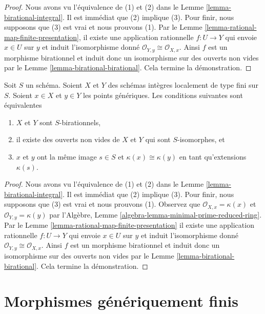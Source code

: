 \begin{proof}
Nous avons vu l'équivalence de (1) et (2) dans
le Lemme \ref{lemma-birational-integral}. Il est immédiat
que (2) implique (3). Pour finir,
nous supposons que (3) est vrai et nous
prouvons (1). Par le Lemme \ref{lemma-rational-map-finite-presentation}, il existe une
application rationnelle $f : U \to Y$
qui envoie $x \in U$ sur $y$
et induit l'isomorphisme donné $\mathcal{O}_{Y, y} \cong \mathcal{O}_{X, x}$. Ainsi $f$ est
un morphisme birationnel et induit donc un isomorphisme
sur des ouverts non
vides par le Lemme \ref{lemma-birational-birational}. Cela termine
la démonstration.
\end{proof}

\begin{lemma}
\label{lemma-common-open}
Soit $S$ un schéma. Soient $X$ et $Y$ des schémas intègres localement
de type fini sur $S$. Soient $x \in X$ et $y \in Y$ les points génériques. Les conditions
suivantes sont équivalentes
\begin{enumerate}
\item $X$ et $Y$ sont $S$-birationnels,
\item il existe des ouverts non vides de $X$ et $Y$ qui sont $S$-isomorphes, et
\item $x$ et $y$ ont la même image
$s \in S$ et $\kappa(x) \cong \kappa(y)$ en tant qu'extensions $\kappa(s)$.
\end{enumerate}
\end{lemma}

\begin{proof}
Nous avons vu l'équivalence de (1) et
(2) dans le Lemme \ref{lemma-birational-integral}. Il
est immédiat que (2) implique
(3). Pour finir, nous supposons que
(3) est vrai et nous prouvons (1). Observez
que $\mathcal{O}_{X, x} = \kappa(x)$ et $\mathcal{O}_{Y, y} = \kappa(y)$
par l'Algèbre, Lemme \ref{algebra-lemma-minimal-prime-reduced-ring}. Par le Lemme
\ref{lemma-rational-map-finite-presentation} il existe une application rationnelle
$f : U \to Y$ qui envoie $x \in U$
sur $y$ et induit
l'isomorphisme donné $\mathcal{O}_{Y, y} \cong \mathcal{O}_{X, x}$. Ainsi $f$ est
un morphisme birationnel et induit donc
un isomorphisme sur des ouverts
non vides par le Lemme \ref{lemma-birational-birational}. Cela termine
la démonstration.
\end{proof}







\section{Morphismes génériquement finis}
\label{section-generically-finite}

